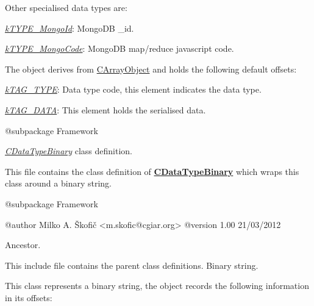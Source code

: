 Other specialised data types are\-:


\begin{DoxyItemize}
\item {\itshape \hyperlink{}{k\-T\-Y\-P\-E\-\_\-\-Mongo\-Id}}\-: Mongo\-D\-B \-\_\-id. 
\item {\itshape \hyperlink{}{k\-T\-Y\-P\-E\-\_\-\-Mongo\-Code}}\-: Mongo\-D\-B map/reduce javascript code. 
\end{DoxyItemize}

The object derives from \hyperlink{class_c_array_object}{C\-Array\-Object} and holds the following default offsets\-:


\begin{DoxyItemize}
\item {\itshape \hyperlink{}{k\-T\-A\-G\-\_\-\-T\-Y\-P\-E}}\-: Data type code, this element indicates the data type. 
\item {\itshape \hyperlink{}{k\-T\-A\-G\-\_\-\-D\-A\-T\-A}}\-: This element holds the serialised data. 
\end{DoxyItemize}

\begin{DoxyVerb} @subpackage        Framework\end{DoxyVerb}


{\itshape \hyperlink{class_c_data_type_binary}{C\-Data\-Type\-Binary}} class definition.

This file contains the class definition of {\bfseries \hyperlink{class_c_data_type_binary}{C\-Data\-Type\-Binary}} which wraps this class around a binary string.

\begin{DoxyVerb} @subpackage        Framework

 @author            Milko A. Škofič <m.skofic@cgiar.org>
 @version   1.00 21/03/2012\end{DoxyVerb}


Ancestor.

This include file contains the parent class definitions. Binary string.

This class represents a binary string, the object records the following information in its offsets\-:


